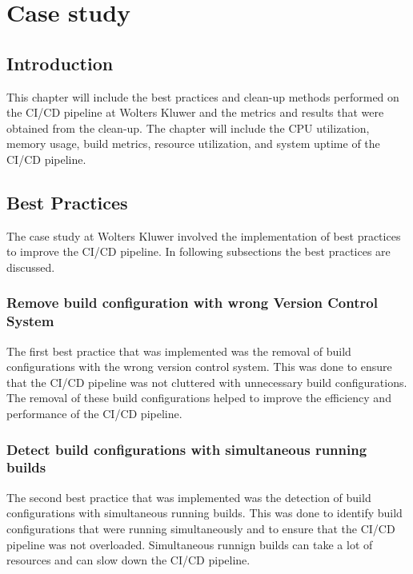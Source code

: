 
\chapter{Case study}%
\label{ch:casestudy}

\section{Introduction}%
\label{sec:introduction-casestudy}
This chapter will include the best practices and clean-up methods performed on the CI/CD pipeline at Wolters Kluwer and the metrics and results that were obtained from the clean-up. The chapter will include the CPU utilization, memory usage, build metrics, resource utilization, and system uptime of the CI/CD pipeline.

\section{Best Practices}%
\label{sec:best-practices}
The case study at Wolters Kluwer involved the implementation of best practices to improve the CI/CD pipeline. In following subsections the best practices are discussed.

\subsection{Remove build configuration with wrong Version Control System}%
\label{sub:remove-build-configuration-with-wrong-version-control-system}
The first best practice that was implemented was the removal of build configurations with the wrong version control system. This was done to ensure that the CI/CD pipeline was not cluttered with unnecessary build configurations. The removal of these build configurations helped to improve the efficiency and performance of the CI/CD pipeline.

\subsection{Detect build configurations with simultaneous running builds}%
\label{sub:detect-build-configurations-with-simultaneous-running-builds}
The second best practice that was implemented was the detection of build configurations with simultaneous running builds. This was done to identify build configurations that were running simultaneously and to ensure that the CI/CD pipeline was not overloaded. Simultaneous runnign builds can take a lot of resources and can slow down the CI/CD pipeline.

